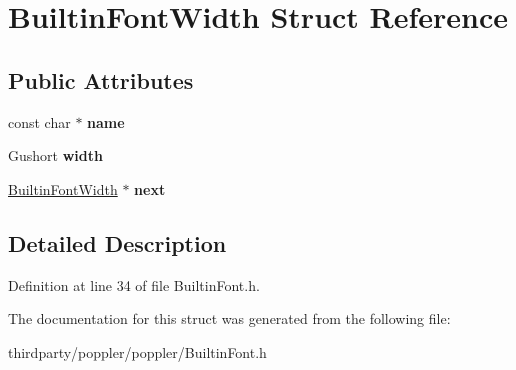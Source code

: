 \hypertarget{struct_builtin_font_width}{}\section{Builtin\+Font\+Width Struct Reference}
\label{struct_builtin_font_width}
\subsection*{Public Attributes}
\begin{DoxyCompactItemize}
\item 
\mbox{\label{struct_builtin_font_width_af4e5d692be9a9c1f4cf7e7172b8c3168}} 
const char $\ast$ {\bfseries name}
\item 
\mbox{\label{struct_builtin_font_width_ab76dd6529a2c982d1ce04c8af670e338}} 
Gushort {\bfseries width}
\item 
\mbox{\label{struct_builtin_font_width_a48a585e152266a87d0b229f544d2c0d8}} 
\hyperlink{struct_builtin_font_width}{Builtin\+Font\+Width} $\ast$ {\bfseries next}
\end{DoxyCompactItemize}


\subsection{Detailed Description}


Definition at line 34 of file Builtin\+Font.\+h.



The documentation for this struct was generated from the following file\+:\begin{DoxyCompactItemize}
\item 
thirdparty/poppler/poppler/Builtin\+Font.\+h\end{DoxyCompactItemize}
